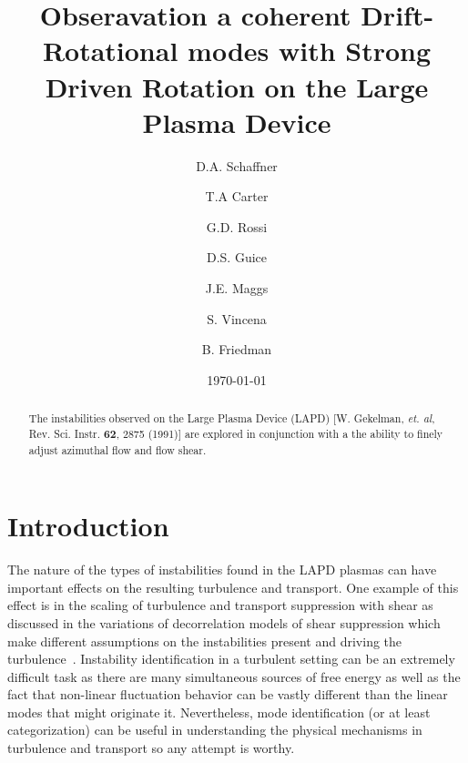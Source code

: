 \documentclass[aip,pop,amsmath,amssymb,reprint,superscriptaddress]{revtex4-1} %
\begin{document}
\title{Obseravation a coherent Drift-Rotational modes with Strong Driven Rotation on the Large Plasma Device}
\author{D.A. Schaffner}
\author{T.A Carter}
\author{G.D. Rossi}
\author{D.S. Guice}
\author{J.E. Maggs}
\author{S. Vincena}
\author{B. Friedman}
\date{\today}
\begin{abstract}
The instabilities observed on the Large Plasma Device (LAPD) [W. Gekelman, \textit{et. al}, Rev. Sci. Instr. \textbf{62}, 2875 (1991)] are explored in conjunction with a the ability to finely adjust azimuthal flow and flow shear.

\end{abstract}
\maketitle

\section{Introduction}

The nature of the types of instabilities found in the LAPD plasmas can have important effects on the resulting turbulence and transport. One example of this effect is in the scaling of turbulence and transport suppression with shear as discussed in the variations of decorrelation models of shear suppression which make different assumptions on the instabilities present and driving the turbulence~\cite{schaffner13}. Instability identification in a turbulent setting can be an extremely difficult task as there are many simultaneous sources of free energy as well as the fact that non-linear fluctuation behavior can be vastly different than the linear modes that might originate it. Nevertheless, mode identification (or at least categorization) can be useful in understanding the physical mechanisms in turbulence and transport so any attempt is worthy.
\end{document}

